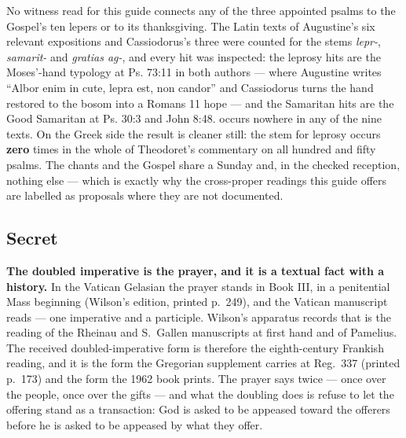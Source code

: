 \begin{witnessnote}
No witness read for this guide connects any of the three appointed psalms to
the Gospel's ten lepers or to its thanksgiving. The Latin texts of Augustine's
six relevant expositions and Cassiodorus's three were counted for the stems
\textit{lepr-}, \textit{samarit-} and \textit{gratias ag-}, and every hit was
inspected: the leprosy hits are the Moses'-hand typology at Ps. 73:11 in both
authors --- where Augustine writes ``Albor enim in cute, lepra est, non
candor'' and Cassiodorus turns the hand restored to the bosom into a Romans 11
hope --- and the Samaritan hits are the Good Samaritan at Ps. 30:3 and John
8:48.  occurs nowhere in any of the nine texts. On the
Greek side the result is cleaner still: the stem for leprosy occurs
\textbf{zero} times in the whole of Theodoret's commentary on all hundred and
fifty psalms. The chants and the Gospel share a Sunday and, in the checked
reception, nothing else --- which is exactly why the cross-proper readings this
guide offers are labelled as proposals where they are not documented.
\end{witnessnote}

\elementguard
\subsection*{Secret }


\textbf{The doubled imperative is the prayer, and it is a textual fact with a
history.} In the Vatican Gelasian the prayer stands in Book III, in a
penitential Mass beginning 
(Wilson's edition, printed p.~249), and the Vatican manuscript reads
 --- one imperative
and a participle. Wilson's apparatus records that  is the reading of the Rheinau and S.\ Gallen manuscripts at first
hand and of Pamelius. The received doubled-imperative form is therefore the
eighth-century Frankish reading, and it is the form the Gregorian supplement
carries at Reg.\ 337 (printed p.~173) and the form the 1962 book prints. The
prayer says  twice --- once over the people, once over the
gifts --- and what the doubling does is refuse to let the offering stand as a
transaction: God is asked to be appeased toward the offerers before he is asked
to be appeased by what they offer.

